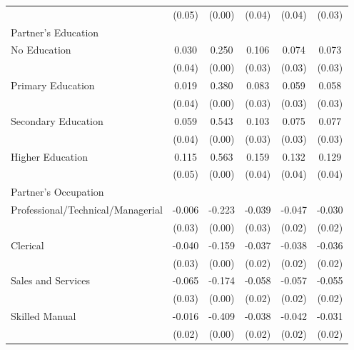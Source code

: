 \begin{longtable}{l*{5}{c}}
                    & (0.05) & (0.00) & (0.04) & (0.04) & (0.03) \\
\multicolumn{6}{l}{Partner's Education} \\
\hspace{1em}No Education & 0.030 & 0.250\sym{***} & 0.106\sym{***} & 0.074\sym{**} & 0.073\sym{**} \\
                    & (0.04) & (0.00) & (0.03) & (0.03) & (0.03) \\
\hspace{1em}Primary Education & 0.019 & 0.380\sym{***} & 0.083\sym{**} & 0.059\sym{*} & 0.058\sym{*} \\
                    & (0.04) & (0.00) & (0.03) & (0.03) & (0.03) \\
\hspace{1em}Secondary Education & 0.059 & 0.543\sym{***} & 0.103\sym{***} & 0.075\sym{**} & 0.077\sym{**} \\
                    & (0.04) & (0.00) & (0.03) & (0.03) & (0.03) \\
\hspace{1em}Higher Education & 0.115\sym{**} & 0.563\sym{***} & 0.159\sym{***} & 0.132\sym{***} & 0.129\sym{***} \\
                    & (0.05) & (0.00) & (0.04) & (0.04) & (0.04) \\
\multicolumn{6}{l}{Partner's Occupation} \\
\hspace{1em}Professional/Technical/Managerial & -0.006 & -0.223\sym{***} & -0.039 & -0.047\sym{*} & -0.030 \\
                    & (0.03) & (0.00) & (0.03) & (0.02) & (0.02) \\
\hspace{1em}Clerical & -0.040 & -0.159\sym{***} & -0.037\sym{*} & -0.038\sym{**} & -0.036\sym{**} \\
                    & (0.03) & (0.00) & (0.02) & (0.02) & (0.02) \\
\hspace{1em}Sales and Services & -0.065\sym{**} & -0.174\sym{***} & -0.058\sym{***} & -0.057\sym{***} & -0.055\sym{***} \\
                    & (0.03) & (0.00) & (0.02) & (0.02) & (0.02) \\
\hspace{1em}Skilled Manual & -0.016 & -0.409\sym{***} & -0.038\sym{**} & -0.042\sym{**} & -0.031\sym{*} \\
                    & (0.02) & (0.00) & (0.02) & (0.02) & (0.02) \\

\end{longtable}
